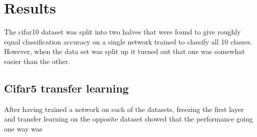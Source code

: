\section{Results}

The cifar10 dataset was split into two halves that were found to give roughly equal classification accuracy on a single network trained to classify all 10 classes. However, when the data set was split up it turned out that one was somewhat easier than the other.  

\subsection{Cifar5 transfer learning}

After having trained a network on each of the datasets, freezing the first layer and transfer learning on the opposite dataset showed that the performance going one way was 

